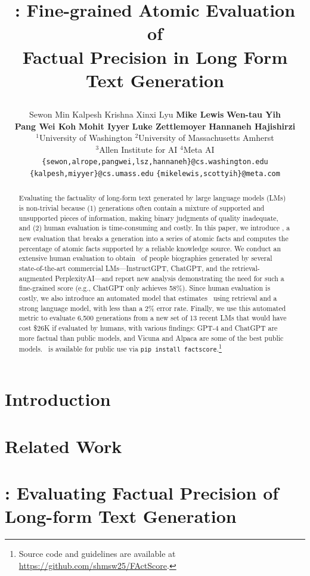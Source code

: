 \documentclass[11pt]{article}
\title{
    \ours:
    Fine-grained Atomic Evaluation of \\ Factual Precision in Long Form Text Generation

}
\author{Sewon Min\affilsup{$\dagger$1} \quad
    Kalpesh Krishna\affilsup{$\dagger$2} \quad
    Xinxi Lyu\affilsup{1} \quad
    \textbf{Mike Lewis}\affilsup{4} \quad 
    \textbf{Wen-tau Yih}\affilsup{4} \\
    \textbf{Pang Wei Koh}\affilsup{1} \quad
    \textbf{Mohit Iyyer}\affilsup{2} \quad
    \textbf{Luke Zettlemoyer}\affilsup{1,4} \quad
    \textbf{Hannaneh Hajishirzi}\affilsup{1,3} \\
    $^1$University of Washington \quad
    $^2$University of Massachusetts Amherst \\
    $^3$Allen Institute for AI \quad
    $^4$Meta AI \\
    \texttt{\{sewon,alrope,pangwei,lsz,hannaneh\}@cs.washington.edu} \\
    \texttt{\{kalpesh,miyyer\}@cs.umass.edu} \quad
    \texttt{\{mikelewis,scottyih\}@meta.com}
}
\newcommand{\hanna}[1]{\textcolor{red}{[Hanna: #1]}
}
\begin{document}
\maketitle

\def\thefootnote{$\dagger$}\def\thefootnote{\arabic{footnote}}

\begin{abstract}
    Evaluating the factuality of long-form text generated by large language models (LMs) is non-trivial because (1) generations often contain a mixture of supported and unsupported pieces of information, making binary judgments of quality inadequate, and (2) human evaluation is time-consuming and costly.
    In this paper, we introduce \textbf{\ours}, %
    a new evaluation %
    that breaks a generation into a series of atomic facts and computes the percentage of atomic facts supported by a reliable knowledge source.
    We conduct an extensive human evaluation to obtain \ourScores\ of people biographies generated by several state-of-the-art commercial LMs---InstructGPT, ChatGPT, and the retrieval-augmented PerplexityAI---and report new analysis demonstrating the need for such a fine-grained score (e.g., ChatGPT only achieves 58\%).
    Since human evaluation is costly, 
    we also introduce an automated model that estimates \ours\ using retrieval and a strong language model, with less than a $2\%$ error rate. 
    Finally, we use this automated metric to evaluate 6,500 generations from a new set of 13 recent LMs that would have cost \$26K if evaluated by humans, with various findings: GPT-4 and ChatGPT are more factual than public models, and Vicuna and Alpaca are some of the best public models. \ours\ is available for public use via \texttt{pip install factscore}.\footnote{Source code and guidelines are available at \url{https://github.com/shmsw25/FActScore}.}
\end{abstract}

\section{Introduction}\label{sec:intro}
\section{Related Work}\label{sec:related}
\section{\ours: Evaluating Factual Precision of Long-form Text Generation}\label{sec:benchmark} %
\end{document}
